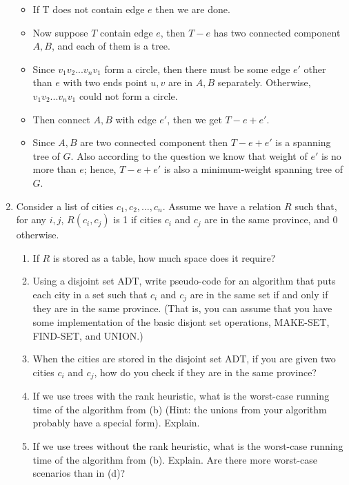 \documentclass[11pt,twoside]{article}
\begin{document}
\begin{enumerate}[leftmargin=0pt]
\begin{itemize}[label = {}]
		\item If T does not contain edge $e$ then we are done.
		\item Now suppose $T$ contain edge $e$, then $T-e$ has two connected component $A, B$, and 
			each of them is a tree. 
		\item Since $v_1v_2...v_n v_1$ form a circle, then there must be some edge $e'$ other than $e$ with 
		two ends point $u,v$ are in $A,B$ separately. Otherwise, $v_1v_2...v_n v_1$ could not form a circle. 
		\item Then connect $A, B$ with edge $e'$, then we get  $T-e+e'$. 
		\item Since $A, B$ are two connected component then $T-e+e'$ is a spanning tree of $G$. Also 
		according to the question we know that weight of $e'$ is no more than $e$; hence, $T-e+e'$  is also a
		minimum-weight spanning tree of $G$.
	\end{itemize}


\item
Consider a list of cities $c_1, c_2, \dots, c_n$.  Assume we have
a relation $R$ such that, for any $i,j$, $R(c_i, c_j)$ is 1 if cities
$c_i$ and $c_j$ are in the same province, and 0 otherwise.

\begin{enumerate}
\item
If $R$ is stored as a table, how much space does it require?


\item
Using a disjoint set ADT, write pseudo-code for an algorithm
that puts each city in a set such that $c_i$ and $c_j$ are in the same
set if and only if they are in the same province.
(That is, you can assume that you have some implementation
of the basic disjont set operations, MAKE-SET, FIND-SET, and UNION.)


\item
When the cities are stored in the disjoint set ADT, if you are
given two cities $c_i$ and $c_j$, how do you check if they are in the
same province?


\item
If we use trees with the rank heuristic, what is the worst-case
running time of the algorithm from (b) (Hint: the unions from your
algorithm probably have a special form).  Explain.


\item
If we use trees without the rank heuristic, what is the worst-case
running time of the algorithm from (b).  Explain.  Are there more
worst-case scenarios than in (d)?


\end{enumerate}
\end{enumerate}
\end{document}
